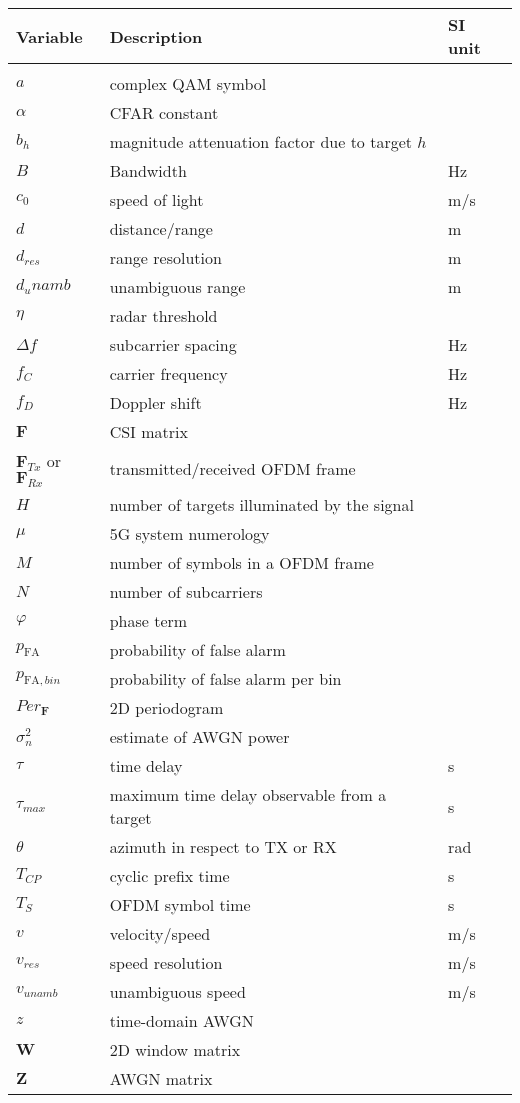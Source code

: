 \documentclass{Configuration_Files/PoliMi3i_thesis}
\begin{document}
\begin{longtable}[c]{lll}
		\textbf{Variable} & \textbf{Description} & \textbf{SI unit} \\\hline\\[-9px]
		$a$ & complex QAM symbol &  \\[1px]
		$\alpha$ & CFAR constant & \\[1px]
		$b_h$ & magnitude attenuation factor due to target $h$ &  \\[2px]
		$B$ & Bandwidth & Hz \\[1px]
		$c_0$ & speed of light & m/s \\[1px]
		$d$ & distance/range & m \\[2px]
		$d_{res}$ & range resolution & m \\[2px]
		$d_unamb$ & unambiguous range & m \\[2px]
		$\eta$ & radar threshold &  \\[2px]
		$\Delta f$ & subcarrier spacing  & Hz \\[2px]	
		$f_C$ & carrier frequency & Hz \\[2px]
		$f_D$ & Doppler shift & Hz \\[2px]
		$\mathbf F$ & CSI matrix &  \\[2px]
		$\mathbf F_{Tx}$ or $\mathbf F_{Rx}$ & transmitted/received OFDM frame &  \\[2px]
		$H$ & number of targets illuminated by the signal &  \\[2px]
		$\mu$ & 5G system numerology &  \\[2px]
		$M$ & number of symbols in a OFDM frame &  \\[2px]
		$N$ & number of subcarriers &  \\[2px]
		$\varphi$ & phase term & \\[2px]
		$p_{\text{FA}}$ & probability of false alarm &  \\[2px]
		$p_{\text{FA},bin}$ & probability of false alarm per bin &  \\[2px]
		$Per_{\mathbf F}$ & 2D periodogram &  \\[2px]
		$\sigma_n^2$ & estimate of AWGN power &  \\[2px]
		$\tau$ & time delay & s \\[2px]
		$\tau_{max}$ & maximum time delay observable from a target & s \\[2px]
		$\theta$ & azimuth in respect to TX or RX & rad \\[2px]
		$T_{CP}$ & cyclic prefix time & s \\[2px]
		$T_S$ & OFDM symbol time &  s \\[2px]
		$v$ & velocity/speed & m/s \\[2px]
		$v_{res}$ & speed resolution & m/s \\[2px]
		$v_{unamb}$ & unambiguous speed & m/s \\[2px]
		$z$ & time-domain AWGN &  \\[2px]
		$\mathbf W$ & 2D window matrix &  \\[2px]
		$\mathbf Z$ & AWGN matrix &  \\[2px]
\end{longtable}
\end{document}
